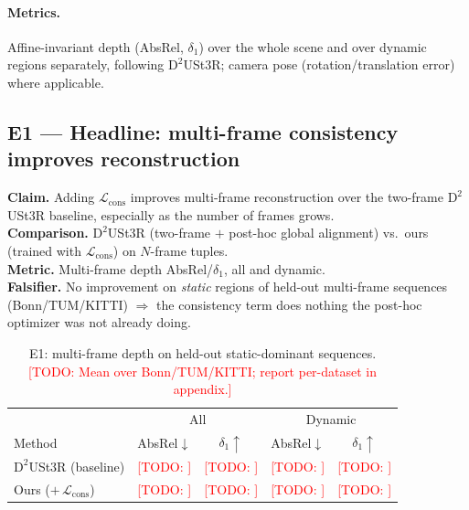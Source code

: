 \documentclass{article}
\newcommand{\Lcons}{\mathcal{L}_{\mathrm{cons}}}
\newcommand{\todo}[1]{\textcolor{red}{[TODO: #1]}}
\theoremstyle{definition}
\theoremstyle{plain}
\theoremstyle{remark}
\begin{document}
\paragraph{Metrics.}
Affine-invariant depth (AbsRel, $\delta_1$) over the whole scene and over
dynamic regions separately, following $\mathrm{D}^2$USt3R; camera pose
(rotation/translation error) where applicable.

\subsection{E1 --- Headline: multi-frame consistency improves reconstruction}
\label{sec:e1}
\textbf{Claim.} Adding $\Lcons$ improves multi-frame reconstruction over
the two-frame $\mathrm{D}^2$USt3R baseline, especially as the number of
frames grows.\\
\textbf{Comparison.} $\mathrm{D}^2$USt3R (two-frame $+$ post-hoc global
alignment) vs.\ ours (trained with $\Lcons$) on $N$-frame tuples.\\
\textbf{Metric.} Multi-frame depth AbsRel/$\delta_1$, all and dynamic.\\
\textbf{Falsifier.} No improvement on \emph{static} regions of held-out
multi-frame sequences (Bonn/TUM/KITTI) $\Rightarrow$ the consistency term
does nothing the post-hoc optimizer was not already doing.

\begin{table}[h]
\centering
\begin{tabular}{lcccc}
\toprule
 & \multicolumn{2}{c}{All} & \multicolumn{2}{c}{Dynamic} \\
Method & AbsRel$\downarrow$ & $\delta_1\uparrow$ & AbsRel$\downarrow$ & $\delta_1\uparrow$ \\
\midrule
$\mathrm{D}^2$USt3R (baseline) & \todo{} & \todo{} & \todo{} & \todo{} \\
Ours ($+\,\Lcons$)            & \todo{} & \todo{} & \todo{} & \todo{} \\
\bottomrule
\end{tabular}
\caption{E1: multi-frame depth on held-out static-dominant sequences.
\todo{Mean over Bonn/TUM/KITTI; report per-dataset in appendix.}}
\label{tab:e1}
\end{table}

\end{document}
